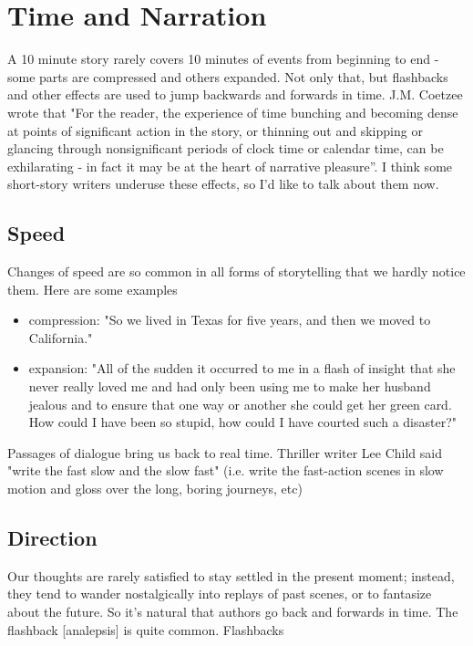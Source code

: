 \documentclass[11pt]{article}
\begin{document}
\newpage
\section{Time and Narration}

A 10 minute story rarely covers 10 minutes of events from beginning to end - some parts are compressed and others expanded. Not only that, but flashbacks and other effects are used to jump backwards and forwards in time. J.M. Coetzee wrote that "For the reader, the experience of time bunching and becoming dense at points of significant action in the story, or thinning out and skipping or glancing through nonsignificant periods of clock time or calendar time, can be exhilarating - in fact it may be at the heart of narrative pleasure''. I think some 
short-story writers underuse these effects, so I'd like to talk about them now. 
 


\subsection*{Speed}
Changes of speed are so common in all forms of storytelling that we hardly notice them. Here are some examples



\begin{itemize}
\item  compression: "So we lived in Texas for five years, and then we moved to California."
\item  expansion: "All of the sudden it occurred to me in a flash of insight that she never really loved me and had only been using me to make her husband jealous and to ensure that one way or another she could get her green card. How could I have been so stupid, how could I have courted such a disaster?"
 \end{itemize}
Passages of dialogue bring us back to real time. Thriller writer Lee Child said "write the fast slow and the slow fast" (i.e. write the fast-action scenes in slow motion and gloss over the long, boring journeys, etc)



 
\subsection*{Direction}
Our thoughts are rarely satisfied to stay settled in the present moment; instead, they tend to wander nostalgically into replays of past scenes, or to fantasize about the future. So it's natural that authors go back and forwards in time. The flashback [analepsis] is quite common. Flashbacks
\end{document}
